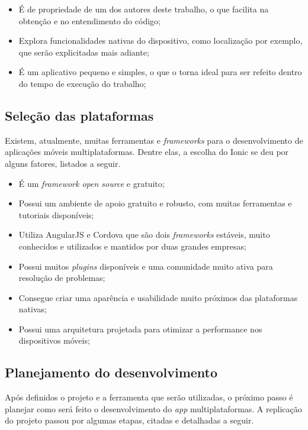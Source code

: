 \begin{itemize}
    \item É de propriedade de um dos autores deste trabalho, o que facilita na obtenção e no entendimento do código;
    \item Explora funcionalidades nativas do dispositivo, como localização por exemplo, que serão explicitadas mais adiante;
    \item É um aplicativo pequeno e simples, o que o torna ideal para ser refeito dentro do tempo de execução do trabalho;
\end{itemize}

\subsection{Seleção das plataformas} \label{subsection:selecaodasplataformas}

Existem, atualmente, muitas ferramentas e \textit{frameworks} para o desenvolvimento de aplicações móveis multiplataformas. Dentre elas, a escolha do Ionic se deu por alguns fatores, listados a seguir. 

\begin{itemize}
    \item É um \textit{framework open source} e gratuito;
    \item Possui um ambiente de apoio gratuito e robusto, com muitas ferramentas e tutoriais disponíveis;
    \item Utiliza AngularJS e Cordova que são dois \textit{frameworks} estáveis, muito conhecidos e utilizados e mantidos por duas grandes empresas;
    \item Possui muitos \textit{plugins} disponíveis e uma comunidade muito ativa para resolução de problemas; %
    \item Consegue criar uma aparência e usabilidade muito próximos das plataformas nativas; %
    \item Possui uma arquitetura projetada para otimizar a performance nos dispositivos móveis; 
\end{itemize}
 
\subsection{Planejamento do desenvolvimento} \label{subsection:planejamentodesenvolvimento}

Após definidos o projeto e a ferramenta que serão utilizadas, o próximo passo é planejar como será feito o desenvolvimento do \textit{app} multiplataformas. 
A replicação do projeto passou por algumas etapas, citadas e detalhadas a seguir.

